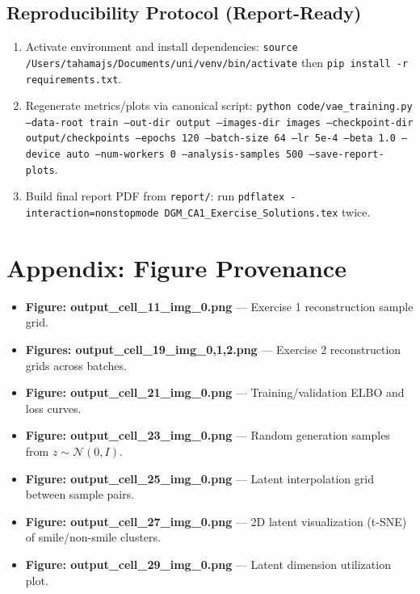 \documentclass[conference]{IEEEtran}
\begin{document}
\subsection{Reproducibility Protocol (Report-Ready)}
\begin{enumerate}
    \item Activate environment and install dependencies: \texttt{source /Users/tahamajs/Documents/uni/venv/bin/activate} then \texttt{pip install -r requirements.txt}.
    \item Regenerate metrics/plots via canonical script: \texttt{python code/vae\_training.py --data-root train --out-dir output --images-dir images --checkpoint-dir output/checkpoints --epochs 120 --batch-size 64 --lr 5e-4 --beta 1.0 --device auto --num-workers 0 --analysis-samples 500 --save-report-plots}.
    \item Build final report PDF from \texttt{report/}: run \texttt{pdflatex -interaction=nonstopmode DGM\_CA1\_Exercise\_Solutions.tex} twice.
\end{enumerate}

\section{Appendix: Figure Provenance}
\begin{itemize}
    \item \textbf{Figure: output\_cell\_11\_img\_0.png} — Exercise 1 reconstruction sample grid.
    \item \textbf{Figures: output\_cell\_19\_img\_{0,1,2}.png} — Exercise 2 reconstruction grids across batches.
    \item \textbf{Figure: output\_cell\_21\_img\_0.png} — Training/validation ELBO and loss curves.
    \item \textbf{Figure: output\_cell\_23\_img\_0.png} — Random generation samples from $z \sim \mathcal{N}(0,I)$.
    \item \textbf{Figure: output\_cell\_25\_img\_0.png} — Latent interpolation grid between sample pairs.
    \item \textbf{Figure: output\_cell\_27\_img\_0.png} — 2D latent visualization (t-SNE) of smile/non-smile clusters.
    \item \textbf{Figure: output\_cell\_29\_img\_0.png} — Latent dimension utilization plot.
\end{itemize}
\end{document}
